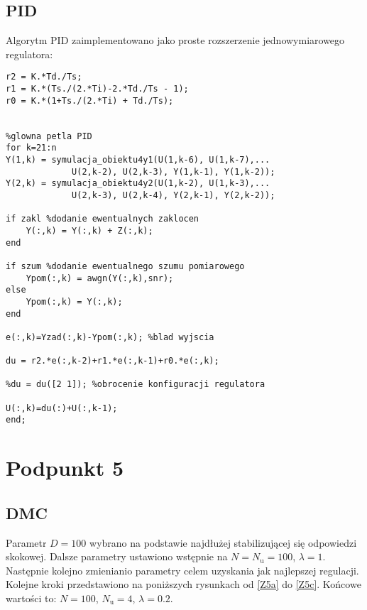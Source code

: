 \section{PID}
Algorytm PID zaimplementowano jako proste rozszerzenie jednowymiarowego regulatora:

\begin{lstlisting}[style=Matlab-editor]
%parametry regulatora (wektory 2x1)
r2 = K.*Td./Ts; 
r1 = K.*(Ts./(2.*Ti)-2.*Td./Ts - 1); 
r0 = K.*(1+Ts./(2.*Ti) + Td./Ts);


%glowna petla PID
for k=21:n 
Y(1,k) = symulacja_obiektu4y1(U(1,k-6), U(1,k-7),...
			 U(2,k-2), U(2,k-3), Y(1,k-1), Y(1,k-2));
Y(2,k) = symulacja_obiektu4y2(U(1,k-2), U(1,k-3),...
			 U(2,k-3), U(2,k-4), Y(2,k-1), Y(2,k-2));

if zakl %dodanie ewentualnych zaklocen
	Y(:,k) = Y(:,k) + Z(:,k);
end

if szum %dodanie ewentualnego szumu pomiarowego
	Ypom(:,k) = awgn(Y(:,k),snr);
else
	Ypom(:,k) = Y(:,k);
end

e(:,k)=Yzad(:,k)-Ypom(:,k); %blad wyjscia

du = r2.*e(:,k-2)+r1.*e(:,k-1)+r0.*e(:,k);

%du = du([2 1]); %obrocenie konfiguracji regulatora

U(:,k)=du(:)+U(:,k-1); 
end; 
\end{lstlisting}
	


\chapter{Podpunkt 5}

\section{DMC}
Parametr $ D = \num{100} $ wybrano na podstawie najdłużej stabilizującej się odpowiedzi skokowej. Dalsze parametry ustawiono wstępnie na $ N = N_\mathrm{u} = \num{100} $, $ \lambda = \num{1} $. Następnie kolejno zmienianio parametry celem uzyskania jak najlepszej regulacji. Kolejne kroki przedstawiono na poniższych rysunkach od \ref{Z5a} do \ref{Z5c}. Końcowe wartości to: $ N = \num{100} $, $ N_\mathrm{u} = \num{4} $, $ \lambda = \num{0,2} $.


